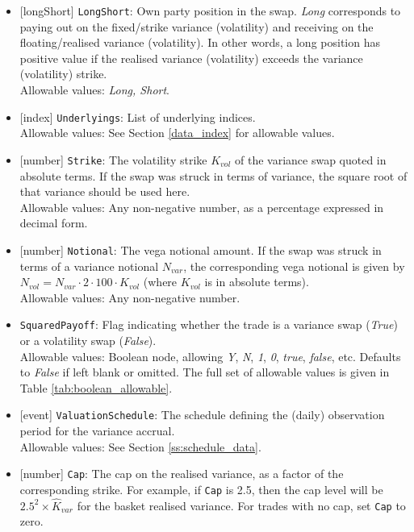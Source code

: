 \begin{itemize}
  \item{}[longShort] \lstinline!LongShort!: Own party position in the swap. \emph{Long} corresponds to paying out on the
  fixed/strike variance (volatility) and receiving on the floating/realised variance (volatility). In other words,
  a long position has positive value if the realised variance (volatility) exceeds the variance (volatility)
  strike. \\
  Allowable values: \emph{Long, Short}.
  \item{}[index] \lstinline!Underlyings!: List of underlying indices. \\
  Allowable values: See Section \ref{data_index} for allowable values. 
  \item{}[number] \lstinline!Strike!: The volatility strike $K_{vol}$ of the variance swap quoted in absolute terms.
  If the swap was struck in terms of variance, the square root of that variance should be used here. \\
  Allowable values: Any non-negative number, as a percentage expressed in decimal form.
  \item{}[number] \lstinline!Notional!: The vega notional amount. If the swap was struck in terms of a variance notional
  $N_{var}$, the corresponding vega notional is given by $N_{vol} = N_{var} \cdot 2 \cdot 100 \cdot K_{vol}$ (where
  $K_{vol}$ is in absolute terms). \\
  Allowable values: Any non-negative number.
  \item{} \lstinline!SquaredPayoff!: Flag indicating whether the trade is a variance swap (\emph{True})
  or a volatility swap (\emph{False}). \\
  Allowable values: Boolean node, allowing \emph{Y}, \emph{N}, \emph{1}, \emph{0}, \emph{true}, \emph{false}, etc.
  Defaults to \emph{False} if left blank or omitted. The full set of allowable values is given in Table \ref{tab:boolean_allowable}.
  \item{}[event] \lstinline!ValuationSchedule!: The schedule defining the (daily) observation period for the variance accrual. \\
  Allowable values: See Section \ref{ss:schedule_data}.
  \item{}[number] \lstinline!Cap!: The cap on the realised variance, as a factor of the corresponding strike. For example,
  if \lstinline!Cap! is 2.5, then the cap level will be $2.5^2 \times \hat{K}_{var}$ for the basket realised variance.
  For trades with no cap, set \lstinline!Cap! to zero. \\

\end{itemize}
